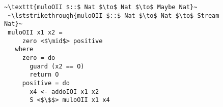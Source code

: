 
\begin{figure}[!t]
  \centering
  \begin{minipage}{\columnwidth}
    \begin{lstlisting}[]
 ~\texttt{muloOII $::$ Nat $\to$ Nat $\to$ Maybe Nat}~
 ~\lststrikethrough{muloOII $::$ Nat $\to$ Nat $\to$ Stream Nat}~
 muloOII x1 x2 =
     zero <$\mid$> positive
   where
     zero = do
       guard (x2 == O)
       return O
     positive = do
       x4 <- addoIOI x1 x2
       S <$\$$> muloOII x1 x4
    \end{lstlisting}
  \end{minipage}
\end{figure}
